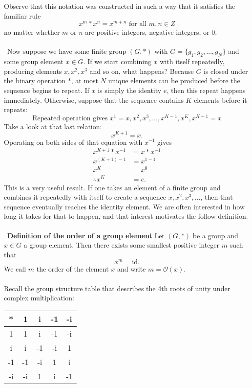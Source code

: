 \documentclass[12 pt]{article}
\numberwithin{equation}{section}
\begin{document}
Observe that this notation was constructed in such a way that it satisfies the familiar rule \begin{equation*}
x^m * x^n = x^{m+n} \mbox{ for all } m,n \in Z
\end{equation*}
no matter whether $m$ or $n$ are positive integers, negative integers, or 0.
\\
\\
\
Now suppose we have some finite group $(G,*)$ with $G = \{g_1, g_2, \ldots, g_N\}$ and some group element $x \in G$. If we start combining $x$ with itself repeatedly, producing elements $x, x^2, x^3$ and so on, what happens? Because $G$ is closed under the binary operation $*$, at most $N$ unique elements can be produced before the sequence begins to repeat. If $x$ is simply the identity $e$, then this repeat happens immediately. Otherwise, suppose that the sequence contains $K$ elements before it repeats: \begin{equation*}
\mbox{Repeated operation gives } x^1 = x, x^2, x^3, \ldots, x^{K-1}, x^K, x^{K+1} = x
\end{equation*}
Take a look at that last relation: \begin{equation*}
x^{K+1} = x .
\end{equation*}
Operating on both sides of that equation with $x^{-1}$ gives \begin{align*}
x^{K+1} * x^{-1} & = x * x^{-1} \\
x^{(K+1)-1} & = x^{1-1} \\
x^K & = x^0 \\
\therefore x^K & = e .
\end{align*}
This is a very useful result. If one takes an element of a finite group and combines it repeatedly with itself to create a sequence $x, x^2, x^3, \ldots$, then that sequence eventually reaches the identity element. We are often interested in how long it takes for that to happen, and that interest motivates the follow definition.
\\
\\
\
\textbf{Definition of the order of a group element} Let $(G, *)$ be a group and $x \in G$ a group element. Then there exists some smallest positive integer $m$ such that \begin{equation*}
x^m = \mbox{id} .
\end{equation*}
We call $m$ the order of the element $x$ and write $m = \mathcal{O}(x)$.
\
\\
\\
Recall the group structure table that describes the 4th roots of unity under complex multiplication:\begin{center}
\begin{tabular}{c | c c c c}
* & 1 & i & -1 & -i \\
\hline
1 & 1 & i & -1 & -i \\
i & i & -1 & -i & 1 \\
-1 & -1 & -i & 1 & i \\
-i & -i & 1 & i & -1
\end{tabular}
\end{center}
\end{document}

